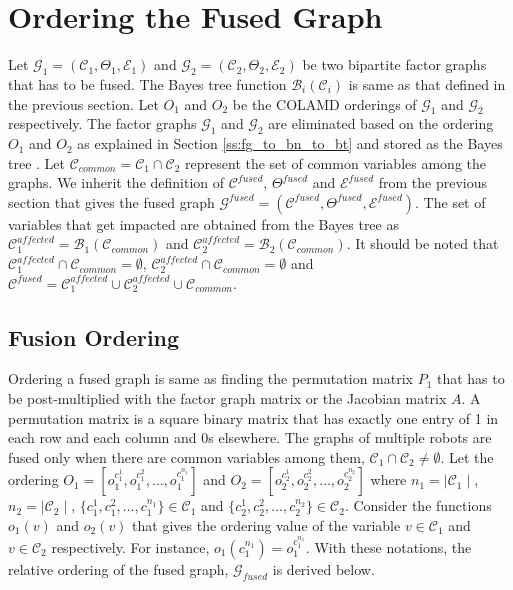 \section{Ordering the Fused Graph}
\label{sec:fusion_ordering}
Let $\mathcal{G}_1 = (\mathcal{C}_1, \Theta_1, \mathcal{E}_1)$ and $\mathcal{G}_2 = (\mathcal{C}_2, \Theta_2, \mathcal{E}_2)$ be two bipartite factor graphs that has to be fused. The Bayes tree function $\mathcal{B}_i(\mathcal{C}_{i})$ is same as that defined in the previous section. Let $O_1$ and $O_2$ be the COLAMD \citep{colamd} orderings of $\mathcal{G}_1$ and $\mathcal{G}_2$ respectively. The factor graphs $\mathcal{G}_1$ and $\mathcal{G}_2$ are eliminated based on the ordering $O_1$ and $O_2$ as explained in Section \ref{ss:fg_to_bn_to_bt} and stored as the Bayes tree \cite{kaessbayestree}. Let $\mathcal{C}_{common} = \mathcal{C}_1 \cap \mathcal{C}_2$ represent the set of common variables among the graphs. We inherit the definition of $\mathcal{C}^{fused}$, $\Theta^{fused}$ and $\mathcal{E}^{fused}$ from the previous section that gives the fused graph $\mathcal{G}^{fused} = (\mathcal{C}^{fused}, \Theta^{fused} ,\mathcal{E}^{fused})$. The set of variables that get impacted are obtained from the Bayes tree as $\mathcal{C}^{affected}_1 = \mathcal{B}_1(\mathcal{C}_{common})$ and $\mathcal{C}^{affected}_2 = \mathcal{B}_2(\mathcal{C}_{common})$. It should be noted that $\mathcal{C}^{affected}_1 \cap \mathcal{C}_{common} = \emptyset$, $\mathcal{C}^{affected}_2 \cap \mathcal{C}_{common} = \emptyset$ and $\mathcal{C}^{fused} = \mathcal{C}^{affected}_1 \cup \mathcal{C}^{affected}_2 \cup \mathcal{C}_{common}$. 

\subsection{Fusion Ordering}
Ordering a fused graph is same as finding the permutation matrix $P_1$ that has to be post-multiplied with the factor graph matrix or the Jacobian matrix $A$. A permutation matrix is a square binary matrix that has exactly one entry of 1 in each row and each column and 0s elsewhere. The graphs of multiple robots are fused only when there are common variables among them, $\mathcal{C}_1 \cap \mathcal{C}_2 \neq \emptyset$. Let the ordering $O_1 = [o^{c^1_1}_1, o^{c^2_1}_1, \ldots, o^{c^{n_1}_1}_1]$ and $O_2 = [o^{c^1_2}_2, o^{c^2_2}_2, \ldots, o^{c^{n_2}_2}_2]$ where $n_1=\mid \mathcal{C}_1 \mid$, $n_2=\mid \mathcal{C}_2 \mid$, $\{ c^1_1, c^2_1, \ldots , c^{n_1}_1 \} \in \mathcal{C}_1$ and $\{ c^1_2, c^2_2, \ldots , c^{n_2}_2 \} \in \mathcal{C}_2$. Consider the functions $o_1(v)$ and $o_2(v)$ that gives the ordering value of the variable $v \in \mathcal{C}_1$ and $v \in \mathcal{C}_2$ respectively. For instance, $o_1(c_1^{n_1}) = o^{c^{n_1}_1}_1$. With these notations, the relative ordering of the fused graph, $\mathcal{G}_{fused}$ is derived below. 
